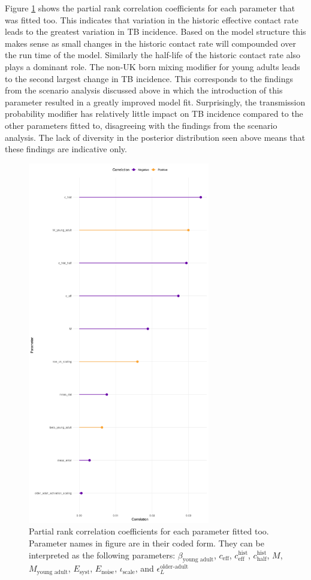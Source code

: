 \documentclass[11pt,twoside]{bristolthesis}
\begin{document}
  Figure \ref{fig:09-fig-sens} shows the partial rank correlation coefficients for each parameter that was fitted too. This indicates that variation in the historic effective contact rate leads to the greatest variation in TB incidence. Based on the model structure this makes sense as small changes in the historic contact rate will compounded over the run time of the model. Similarly the half-life of the historic contact rate also plays a dominant role. The non-UK born mixing modifier for young adults leads to the second largest change in TB incidence. This corresponds to the findings from the scenario analysis discussed above in which the introduction of this parameter resulted in a greatly improved model fit. Surprisingly, the transmission probability modifier has relatively little impact on TB incidence compared to the other parameters fitted to, disagreeing with the findings from the scenario analysis. The lack of diversity in the posterior distribution seen above means that these findings are indicative only.
  \begin{figure}
  
  {\centering \includegraphics[width=300px]{chapters/model-fitting/plots/incidence-sensitivity-1} 
  
  }
  
  \caption[Partial rank correlation coefficients for each parameter fitted too.]{Partial rank correlation coefficients for each parameter fitted too. Parameter names in figure are in their coded form. They can be interpreted as the following parameters:  $\beta_{\text{young adult}}$, $c_{\text{eff}}$, $c^{\text{hist}}_{\text{eff}}$, $c^{\text{hist}}_{\text{half}}$, $M$, $M_{\text{young adult}}$, $E_{\text{syst}}$, $E_{\text{noise}}$, $\iota_{\text{scale}}$, and $\epsilon^{\text{older-adult}}_L$}\label{fig:09-fig-sens}
  \end{figure}
\end{document}
